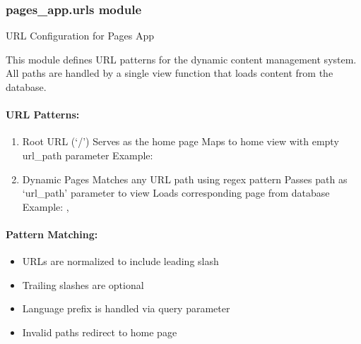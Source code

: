 \documentclass[letterpaper,10pt,english]{sphinxmanual}
\begin{document}
\subsubsection{pages\_app.urls module}
\label{\detokenize{pages_app:module-pages_app.urls}}\label{\detokenize{pages_app:pages-app-urls-module}}
\sphinxAtStartPar
URL Configuration for Pages App

\sphinxAtStartPar
This module defines URL patterns for the dynamic content management system.
All paths are handled by a single view function that loads content from the database.


\paragraph{URL Patterns:}
\label{\detokenize{pages_app:url-patterns}}\begin{enumerate}
%
\item {} 
\sphinxAtStartPar
Root URL (‘/’)
\sphinxhyphen{} Serves as the home page
\sphinxhyphen{} Maps to home view with empty url\_path parameter
\sphinxhyphen{} Example: 

\item {} 
\sphinxAtStartPar
Dynamic Pages
\sphinxhyphen{} Matches any URL path using regex pattern
\sphinxhyphen{} Passes path as ‘url\_path’ parameter to view
\sphinxhyphen{} Loads corresponding page from database
\sphinxhyphen{} Example: , 

\end{enumerate}


\paragraph{Pattern Matching:}
\label{\detokenize{pages_app:pattern-matching}}\begin{itemize}
\item {} 
\sphinxAtStartPar
URLs are normalized to include leading slash

\item {} 
\sphinxAtStartPar
Trailing slashes are optional

\item {} 
\sphinxAtStartPar
Language prefix is handled via query parameter

\item {} 
\sphinxAtStartPar
Invalid paths redirect to home page

\end{itemize}
\end{document}
